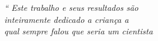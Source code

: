 \begin{epigrafe}
	\vspace*{\fill}
	\begin{flushright}
		\textit{``
		Este trabalho e seus resultados são
		\\ inteiramente dedicado a criança a 
		\\ qual sempre falou que seria um cientista}
	\end{flushright}
\end{epigrafe}
